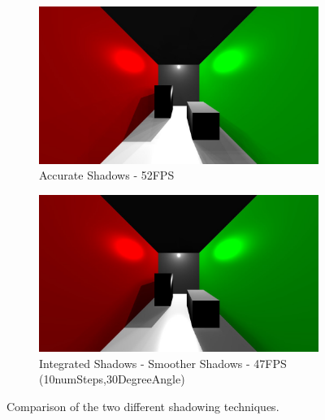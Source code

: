 \begin{figure}
        \centering
        \begin{subfigure}[b]{1.0\textwidth}
                \includegraphics[width=\textwidth]{AltResults/oldmethod.jpg}
                \caption{Accurate Shadows - 52FPS}
        \end{subfigure}
        \centering
        \begin{subfigure}[b]{1.0\textwidth}
                \includegraphics[width=\textwidth]{AltResults/10numSteps30Angle.jpg}
                \caption{Integrated Shadows - Smoother Shadows - 47FPS (10numSteps,30DegreeAngle)}
        \end{subfigure}
        \caption{Comparison of the two different shadowing techniques.}\label{fig:methodCompare}
\end{figure}

